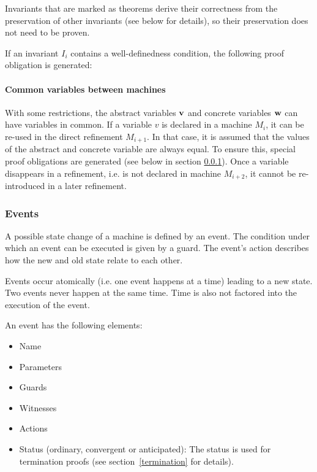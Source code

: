 Invariants that are marked as theorems derive their correctness from the preservation of other invariants (see below for details), so their preservation does not need to be proven.

If an invariant $I_i$ contains a well-definedness condition, the following proof obligation is generated:

\paragraph{Common variables between machines}
With some restrictions, the abstract variables $\mathbf{v}$ and concrete
  variables $\mathbf{w}$ can have variables in common.
If a variable $v$ is declared in a machine $M_i$, it can be re-used in the
  direct refinement $M_{i+1}$. 
In that case, it is assumed that the values of the abstract and concrete variable 
  are always equal.
To ensure this, special proof obligations are generated (see below in section \ref{events}).
Once a variable disappears in a refinement, i.e. is not declared in machine $M_{i+2}$,
  it cannot be re-introduced in a later refinement.

\subsubsection{Events}
\label{events}
A possible state change of a machine is defined by an event.
The condition under which an event can be executed is given by a guard. The event's action
describes how the new and old state relate to each other.

Events occur atomically (i.e. one event happens at a time) leading to a new state.
Two events never happen at the same time. Time is also not factored into the execution of the event.

An event has the following elements:
\begin{itemize}
\item Name
\item Parameters
\item Guards
\item Witnesses
\item Actions
\item Status (ordinary, convergent or anticipated): The status is used
  for termination proofs (see section~\ref{termination} for details).
\end{itemize}

